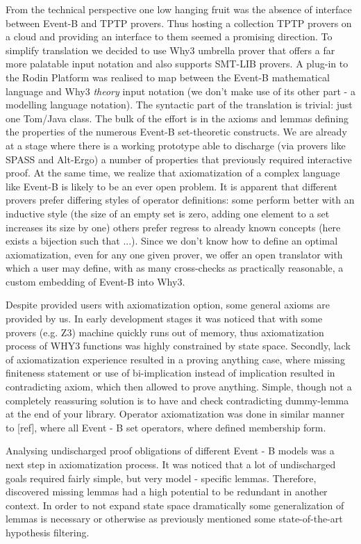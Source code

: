 \documentclass[twocolumn,a4paper,10pt]{article}
\begin{document}
From the technical perspective one low hanging fruit was the absence of interface between Event-B and TPTP provers. Thus hosting a collection TPTP provers on a cloud and providing an interface to them seemed a promising direction. To simplify translation we decided to use Why3 \cite{boogie11why3} umbrella prover that offers a far more palatable input notation and also supports SMT-LIB provers. A plug-in to the Rodin Platform was realised to map between the Event-B mathematical language and Why3 \emph{theory} input notation (we don't make use of its other part - a modelling language notation). The syntactic part of the translation is trivial: just one Tom/Java class. The bulk of the effort is in the axioms and lemmas defining the properties of the numerous Event-B set-theoretic constructs. We are already at a stage where there is a working prototype able to discharge (via provers like SPASS and Alt-Ergo) a number of properties that previously required interactive proof. At the same time, we realize that axiomatization of a complex language like Event-B is likely to be an ever open problem. It is apparent that different provers prefer differing styles of operator definitions: some perform better with an inductive style (the size of an empty set is zero, adding one element to a set increases its size by one) others prefer regress to already known concepts (here exists a bijection such that ...). Since we don't know how to define an optimal axiomatization, even for any one given prover, we offer an open translator with which a user may define, with as many cross-checks as practically reasonable, a custom embedding of Event-B into Why3.

Despite provided users with axiomatization option, some general axioms are provided by us. In early development stages it was noticed that with some provers (e.g. Z3) machine quickly runs out of memory, thus axiomatization process of WHY3 functions was highly constrained by state space. Secondly, lack of axiomatization experience resulted in a proving anything case, where missing finiteness statement or use of bi-implication instead of implication resulted in contradicting axiom, which then allowed to prove anything. Simple, though not a completely reassuring solution is to have and check contradicting dummy-lemma at the end of your library. Operator axiomatization was done in similar manner to [ref], where all Event - B set operators, where defined membership form. 

Analysing undischarged proof obligations of different Event - B models was a next step in axiomatization process. It was noticed that a lot of undischarged goals required fairly simple, but very model - specific lemmas. Therefore, discovered missing lemmas had a high potential to be redundant in another context. In order to not expand state space dramatically some generalization of lemmas is necessary or otherwise as previously mentioned some state-of-the-art hypothesis filtering. 
\end{document}
